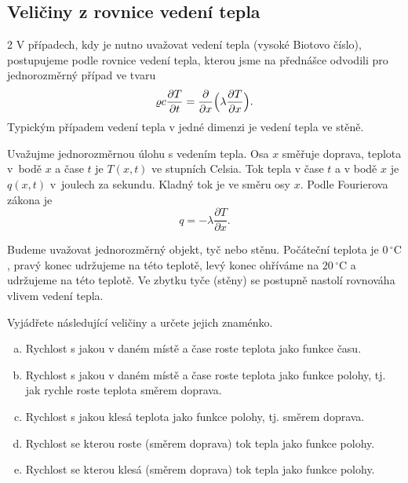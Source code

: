\konec

\subsection{Veličiny z rovnice vedení tepla}

\begin{multicols}2
V případech, kdy je nutno uvažovat vedení tepla (vysoké Biotovo číslo), postupujeme podle rovnice vedení tepla, kterou jsme na přednášce odvodili pro jednorozměrný případ ve tvaru
$$\varrho c \frac{\partial T}{\partial t}=\frac{\partial}{\partial x}\Bigl(\lambda\frac{\partial T}{\partial x}\Bigr).$$  Typickým případem vedení tepla v jedné dimenzi je vedení tepla ve stěně. 

Uvažujme jednorozměrnou úlohu s vedením tepla. Osa $x$ směřuje doprava, teplota v~bodě $x$ a čase $t$ je $T(x,t)$ ve stupních Celsia. Tok tepla v čase $t$ a v bodě $x$ je $q(x,t)$ v~joulech za sekundu. Kladný tok je ve směru osy $x$.
Podle Fourierova zákona je $$q=-\lambda \frac{\partial T}{\partial x}.$$

Budeme uvažovat jednorozměrný objekt, tyč nebo stěnu. Počáteční teplota je $0\,^{\circ}\mathrm{C}$, pravý konec udržujeme na této teplotě, levý konec ohříváme na $20\,^{\circ}\mathrm{C}$ a udržujeme na této teplotě. Ve zbytku tyče (stěny) se postupně nastolí rovnováha vlivem vedení tepla.

\vspace*{-5pt}
Vyjádřete následující veličiny a určete jejich znaménko.

\vspace*{-15pt}
\begin{enumerate}[a)] pt
\item Rychlost s jakou v daném místě a čase roste teplota jako funkce času.
\item Rychlost s jakou v daném místě a čase roste teplota jako funkce polohy, tj. jak rychle  roste teplota směrem doprava.
\item Rychlost s jakou klesá teplota jako funkce polohy, tj. směrem doprava.
\item Rychlost se kterou roste (směrem doprava) tok tepla jako funkce polohy.
\item Rychlost se kterou klesá (směrem doprava) tok tepla jako funkce polohy.
\end{enumerate}
\end{multicols}

